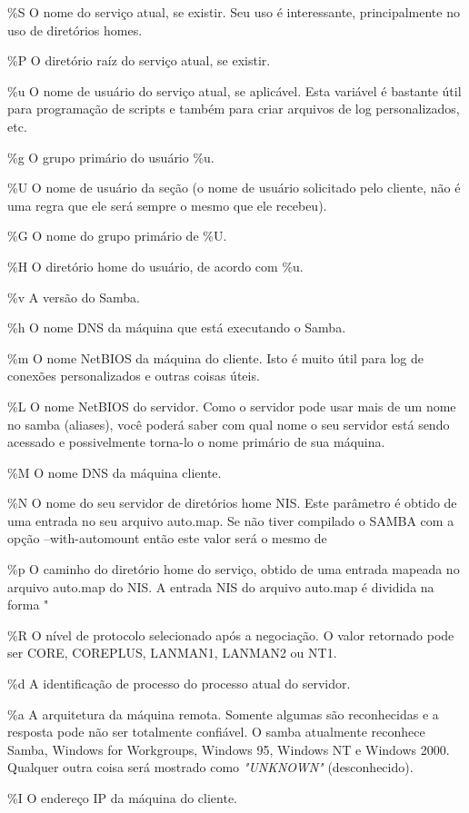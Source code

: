 \%S
O nome do serviço atual, se existir. Seu uso é interessante, principalmente no uso de diretórios homes.

\%P
O diretório raíz do serviço atual, se existir.

\%u
O nome de usuário do serviço atual, se aplicável. Esta variável é bastante útil para programação de scripts e também para criar arquivos de log personalizados, etc.

\%g
O grupo primário do usuário \%u.

\%U
O nome de usuário da seção (o nome de usuário solicitado pelo cliente, não é uma regra que ele será sempre o mesmo que ele recebeu).

\%G
O nome do grupo primário de \%U.

\%H
O diretório home do usuário, de acordo com \%u.

\%v
A versão do Samba.

\%h
O nome DNS da máquina que está executando o Samba.

\%m
O nome NetBIOS da máquina do cliente. Isto é muito útil para log de conexões personalizados e outras coisas úteis.

\%L
O nome NetBIOS do servidor. Como o servidor pode usar mais de um nome no samba (aliases), você poderá saber com qual nome o seu servidor está sendo acessado e possivelmente torna-lo o nome primário de sua máquina.

\%M
O nome DNS da máquina cliente.

\%N
O nome do seu servidor de diretórios home NIS. Este parâmetro é obtido de uma entrada no seu arquivo auto.map. Se não tiver compilado o SAMBA com a opção --with-automount então este valor será o mesmo de %

\%p
O caminho do diretório home do serviço, obtido de uma entrada mapeada no arquivo auto.map do NIS. A entrada NIS do arquivo auto.map é dividida na forma "%

\%R
O nível de protocolo selecionado após a negociação. O valor retornado pode ser CORE, COREPLUS, LANMAN1, LANMAN2 ou NT1.

\%d
A identificação de processo do processo atual do servidor.

\%a
A arquitetura da máquina remota. Somente algumas são reconhecidas e a resposta pode não ser totalmente confiável. O samba atualmente reconhece Samba, Windows for Workgroups, Windows 95, Windows NT e Windows 2000. Qualquer outra coisa será mostrado como \textit{"UNKNOWN"} (desconhecido).

\%I
O endereço IP da máquina do cliente.

